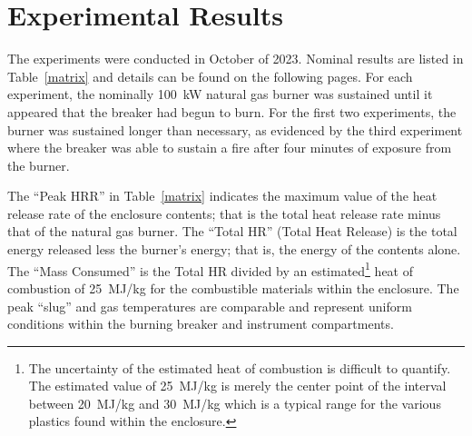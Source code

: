 \documentclass[12pt]{article}
\begin{document}
\clearpage


\section{Experimental Results}

The experiments were conducted in October of 2023. Nominal results are listed in Table~\ref{matrix} and details can be found on the following pages. For each experiment, the nominally 100~kW natural gas burner was sustained until it appeared that the breaker had begun to burn. For the first two experiments, the burner was sustained longer than necessary, as evidenced by the third experiment where the breaker was able to sustain a fire after four minutes of exposure from the burner.

The ``Peak HRR'' in Table~\ref{matrix} indicates the maximum value of the heat release rate of the enclosure contents; that is the total heat release rate minus that of the natural gas burner. The ``Total HR'' (Total Heat Release) is the total energy released less the burner's energy; that is, the energy of the contents alone. The ``Mass Consumed'' is the Total HR divided by an estimated\footnote{The uncertainty of the estimated heat of combustion is difficult to quantify. The estimated value of 25~MJ/kg is merely the center point of the interval between 20~MJ/kg and 30~MJ/kg which is a typical range for the  various plastics found within the enclosure.} heat of combustion of 25~MJ/kg for the combustible materials within the enclosure. The peak ``slug'' and gas temperatures are comparable and represent uniform conditions within the burning breaker and instrument compartments.
\end{document}
